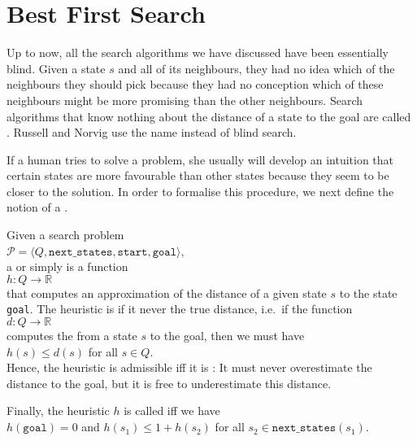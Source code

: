 \section{Best First Search}
Up to now, all the search algorithms we have discussed have been essentially blind.  Given a state $s$ and
all of its neighbours, they had no idea which of the neighbours they should pick because they had no conception
which of these neighbours might be more promising than the other neighbours.  Search algorithms that know nothing
about the distance of a state to the goal are called .  
Russell and Norvig \cite{russell:2009} use the name  instead of blind search.

If a human tries to solve a
problem, she usually will develop an intuition that certain states are more favourable than other states because
they seem to be closer to the solution.  In order to formalise this procedure, we next define the notion of a
. 


\begin{Definition}
Given a search problem
\\[0.2cm]
\hspace*{1.3cm}
$\mathcal{P} = \langle Q, \mathtt{next\_states}, \mathtt{start}, \mathtt{goal} \rangle$,
\\[0.2cm]
a  or simply  is a function 
\\[0.2cm]
\hspace*{1.3cm}
$h: Q \rightarrow \mathbb{R}$
\\[0.2cm]
that computes an approximation of the distance of a given state $s$ to the state \texttt{goal}.
The heuristic is   if it never
\underline{\color{red}{overestimates}} the true distance, i.e.~if the function 
\\[0.2cm]
\hspace*{1.3cm}
$d:Q \rightarrow \mathbb{R}$
\\[0.2cm]
computes the  from a state $s$ to the goal, then we must have
\\[0.2cm]
\hspace*{1.3cm}
$h(s) \leq d(s)$ \quad for all $s \in Q$.
\\[0.2cm]
Hence, the heuristic is admissible iff it is : 
It must never overestimate the
distance to the goal, but it is free to underestimate this distance.

Finally, the  heuristic $h$ is called   iff we have 
\\[0.2cm]
\hspace*{1.3cm}
$h(\mathtt{goal}) = 0$ \quad and \quad $h(s_1) \leq 1 + h(s_2)$ \quad for all $s_2 \in \mathtt{next\_states}(s_1)$.  \eod
\end{Definition}


